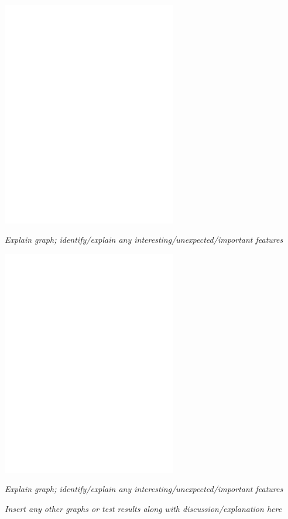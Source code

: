 \documentclass[11pt, letterpaper]{article}
\begin{document}
\centerline{\includegraphics[width=3in]{plot3}}

{\em Explain graph; identify/explain any
  interesting/unexpected/important features}

\centerline{\includegraphics[width=3in]{plot3b}}

{\em Explain graph; identify/explain any
  interesting/unexpected/important features}

{\em Insert any other graphs or test results along with
  discussion/explanation here}
\end{document}
